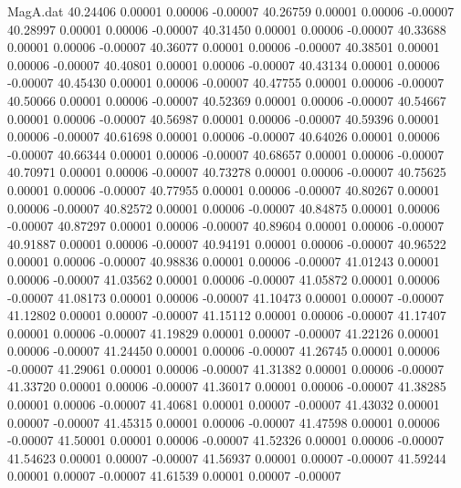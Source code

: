 \begin{filecontents}{MagA.dat}
  40.24406    0.00001    0.00006   -0.00007
  40.26759    0.00001    0.00006   -0.00007
  40.28997    0.00001    0.00006   -0.00007
  40.31450    0.00001    0.00006   -0.00007
  40.33688    0.00001    0.00006   -0.00007
  40.36077    0.00001    0.00006   -0.00007
  40.38501    0.00001    0.00006   -0.00007
  40.40801    0.00001    0.00006   -0.00007
  40.43134    0.00001    0.00006   -0.00007
  40.45430    0.00001    0.00006   -0.00007
  40.47755    0.00001    0.00006   -0.00007
  40.50066    0.00001    0.00006   -0.00007
  40.52369    0.00001    0.00006   -0.00007
  40.54667    0.00001    0.00006   -0.00007
  40.56987    0.00001    0.00006   -0.00007
  40.59396    0.00001    0.00006   -0.00007
  40.61698    0.00001    0.00006   -0.00007
  40.64026    0.00001    0.00006   -0.00007
  40.66344    0.00001    0.00006   -0.00007
  40.68657    0.00001    0.00006   -0.00007
  40.70971    0.00001    0.00006   -0.00007
  40.73278    0.00001    0.00006   -0.00007
  40.75625    0.00001    0.00006   -0.00007
  40.77955    0.00001    0.00006   -0.00007
  40.80267    0.00001    0.00006   -0.00007
  40.82572    0.00001    0.00006   -0.00007
  40.84875    0.00001    0.00006   -0.00007
  40.87297    0.00001    0.00006   -0.00007
  40.89604    0.00001    0.00006   -0.00007
  40.91887    0.00001    0.00006   -0.00007
  40.94191    0.00001    0.00006   -0.00007
  40.96522    0.00001    0.00006   -0.00007
  40.98836    0.00001    0.00006   -0.00007
  41.01243    0.00001    0.00006   -0.00007
  41.03562    0.00001    0.00006   -0.00007
  41.05872    0.00001    0.00006   -0.00007
  41.08173    0.00001    0.00006   -0.00007
  41.10473    0.00001    0.00007   -0.00007
  41.12802    0.00001    0.00007   -0.00007
  41.15112    0.00001    0.00006   -0.00007
  41.17407    0.00001    0.00006   -0.00007
  41.19829    0.00001    0.00007   -0.00007
  41.22126    0.00001    0.00006   -0.00007
  41.24450    0.00001    0.00006   -0.00007
  41.26745    0.00001    0.00006   -0.00007
  41.29061    0.00001    0.00006   -0.00007
  41.31382    0.00001    0.00006   -0.00007
  41.33720    0.00001    0.00006   -0.00007
  41.36017    0.00001    0.00006   -0.00007
  41.38285    0.00001    0.00006   -0.00007
  41.40681    0.00001    0.00007   -0.00007
  41.43032    0.00001    0.00007   -0.00007
  41.45315    0.00001    0.00006   -0.00007
  41.47598    0.00001    0.00006   -0.00007
  41.50001    0.00001    0.00006   -0.00007
  41.52326    0.00001    0.00006   -0.00007
  41.54623    0.00001    0.00007   -0.00007
  41.56937    0.00001    0.00007   -0.00007
  41.59244    0.00001    0.00007   -0.00007
  41.61539    0.00001    0.00007   -0.00007

\end{filecontents}
